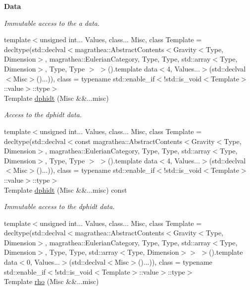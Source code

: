 \begin{Indent}{\bf Data}
\begin{DoxyCompactItemize}
\begin{DoxyCompactList}\small\item\em Immutable access to the a data. \end{DoxyCompactList}\item 
{\footnotesize template$<$unsigned int... Values, class... Misc, class Template  = decltype(std\-::declval$<$magrathea\-::\-Abstract\-Contents$<$\-Gravity$<$\-Type, Dimension$>$, magrathea\-::\-Eulerian\-Category, Type, Type, std\-::array$<$\-Type, Dimension$>$, Type, Type $>$ $>$().\-template data$<$4, Values...$>$(std\-::declval$<$\-Misc$>$()...)), class  = typename std\-::enable\-\_\-if$<$!std\-::is\-\_\-void$<$\-Template$>$\-::value$>$\-::type$>$ }\\Template \hyperlink{exceptionGravity_ae6ba904e0f30f22fa39097c1c45608db}{dphidt} (Misc \&\&...misc)
\begin{DoxyCompactList}\small\item\em Access to the dphidt data. \end{DoxyCompactList}\item 
{\footnotesize template$<$unsigned int... Values, class... Misc, class Template  = decltype(std\-::declval$<$const magrathea\-::\-Abstract\-Contents$<$\-Gravity$<$\-Type, Dimension$>$, magrathea\-::\-Eulerian\-Category, Type, Type, std\-::array$<$\-Type, Dimension$>$, Type, Type $>$ $>$().\-template data$<$4, Values...$>$(std\-::declval$<$\-Misc$>$()...)), class  = typename std\-::enable\-\_\-if$<$!std\-::is\-\_\-void$<$\-Template$>$\-::value$>$\-::type$>$ }\\Template \hyperlink{exceptionGravity_a2e8404f5cd0be7af0ab9f227a4bb1bb5}{dphidt} (Misc \&\&...misc) const 
\begin{DoxyCompactList}\small\item\em Immutable access to the dphidt data. \end{DoxyCompactList}\item 
{\footnotesize template$<$unsigned int... Values, class... Misc, class Template  = decltype(std\-::declval$<$magrathea\-::\-Abstract\-Contents$<$\-Gravity$<$\-Type, Dimension$>$, magrathea\-::\-Eulerian\-Category, Type, Type, std\-::array$<$\-Type, Dimension$>$, Type, Type, std\-::array$<$\-Type, Dimension$>$$>$ $>$().\-template data$<$0, Values...$>$(std\-::declval$<$\-Misc$>$()...)), class  = typename std\-::enable\-\_\-if$<$!std\-::is\-\_\-void$<$\-Template$>$\-::value$>$\-::type$>$ }\\Template \hyperlink{exceptionGravity_a2d44fd05ca6c4c530dc6080a1343ddb1}{rho} (Misc \&\&...misc)

\end{DoxyCompactItemize}
\end{Indent}
